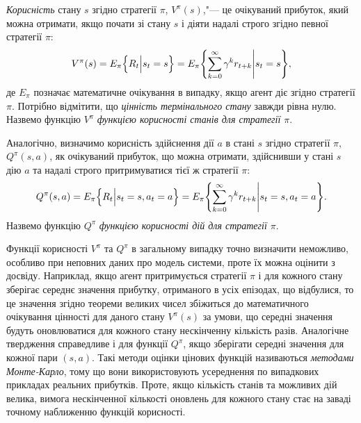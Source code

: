 \documentclass[a4paper,10pt,fleqn]{article}
\begin{document}
\emph{Корисність} стану $s$ згідно стратегії $\pi$, $V^\pi(s)$,"--- це очікуваний прибуток, який можна отримати, якщо почати зі стану $s$ і діяти надалі строго згідно певної стратегії $\pi$:
\begin{equation}
V^\pi(s) = E_\pi \Bigl\{ R_t \Big| s_t = s \Bigr \} = E_\pi \Biggl\{\sum_{k=0}^{\infty}\gamma^k r_{t+k} \Bigg| s_t=s \Biggr\},
\end{equation}
де $E_\pi{}$ позначає математичне очікування в випадку, якщо агент діє згідно стратегії $\pi$. Потрібно відмітити, що \emph{цінність термінального стану} завжди рівна нулю. Назвемо функцію $V^\pi$ \emph{функцією корисності станів для стратегії $\pi$}.

Аналогічно, визначимо корисність здійснення дії $a$ в стані $s$ згідно стратегії $\pi$, $Q^\pi(s,a)$, як очікуваний прибуток, що можна отримати, здійснивши у стані $s$ дію $a$ та надалі строго притримуватися тієї ж стратегії $\pi$:
\begin{equation}
Q^\pi(s,a)=E_\pi \Bigl\{ R_t \Big| s_t=s, a_t=a \Bigr\} = E_\pi \Biggl\{\sum_{k=0}^{\infty}\gamma^k r_{t+k} \Bigg| s_t=s,a_t=a \Biggr\}.
\end{equation}
Назвемо функцію $Q^\pi$ \emph{функцією корисності дій для стратегії $\pi$}.

Функції корисності $V^\pi$ та $Q^\pi$ в загальному випадку точно визначити неможливо, особливо при неповних даних про модель системи, проте їх можна оцінити з досвіду. Наприклад, якщо агент притримується стратегії $\pi$ і для кожного стану зберігає середнє значення прибутку, отриманого в усіх епізодах, що відбулися, то це значення згідно теореми великих чисел збіжиться до математичного очікування цінності для даного стану $V^\pi(s)$ за умови, що середні значення будуть оновлюватися для кожного стану нескінченну кількість разів. Аналогічне твердження справедливе і для функції $Q^\pi$, якщо зберігати середні значення для кожної пари $(s,a)$. Такі методи оцінки цінових функцій називаються \emph{методами Монте-Карло}, тому що вони використовують усереднення по випадкових прикладах реальних прибутків. Проте, якщо кількість станів та можливих дій велика, вимога нескінченної кількості оновлень для кожного стану стає на заваді точному наближенню функцій корисності.
\end{document}
